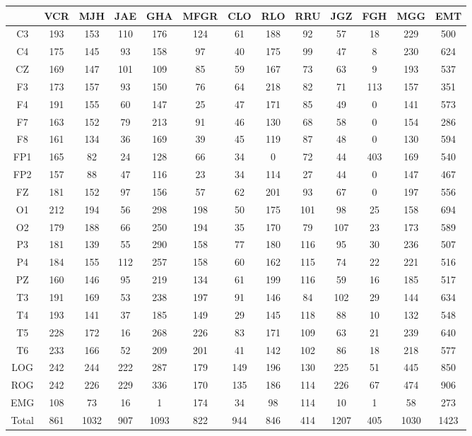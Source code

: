 \begin{SidewaysFigure}
\centering
\begin{tabular}{c|ccccc|cccc|ccc}
& VCR & MJH & JAE & GHA & MFGR
& CLO & RLO & RRU & JGZ
& FGH & MGG & EMT \\
\hline
C3&193&153&110&176&124&61&188&92&57&18&229&500 \\
C4&175&145&93&158&97&40&175&99&47&8&230&624 \\
CZ&169&147&101&109&85&59&167&73&63&9&193&537 \\
F3&173&157&93&150&76&64&218&82&71&113&157&351 \\
F4&191&155&60&147&25&47&171&85&49&0&141&573 \\
F7&163&152&79&213&91&46&130&68&58&0&154&286 \\
F8&161&134&36&169&39&45&119&87&48&0&130&594 \\
FP1&165&82&24&128&66&34&0&72&44&403&169&540 \\
FP2&157&88&47&116&23&34&114&27&44&0&147&467 \\
FZ&181&152&97&156&57&62&201&93&67&0&197&556 \\
O1&212&194&56&298&198&50&175&101&98&25&158&694 \\
O2&179&188&66&250&194&35&170&79&107&23&173&589 \\
P3&181&139&55&290&158&77&180&116&95&30&236&507 \\
P4&184&155&112&257&158&60&162&115&74&22&221&516 \\
PZ&160&146&95&219&134&61&199&116&59&16&185&517 \\
T3&191&169&53&238&197&91&146&84&102&29&144&634 \\
T4&193&141&37&185&149&29&145&118&88&10&132&548 \\
T5&228&172&16&268&226&83&171&109&63&21&239&640 \\
T6&233&166&52&209&201&41&142&102&86&18&218&577 \\
LOG&242&244&222&287&179&149&196&130&225&51&445&850 \\
ROG&242&226&229&336&170&135&186&114&226&67&474&906 \\
EMG&108&73&16&1&174&34&98&114&10&1&58&273 \\
\hline
Total&861&1032&907&1093&822&944&846&414&1207&405&1030&1423
\end{tabular}
\caption{Total de \'epocas PE registradas
(todas las fases) para cada
canal. 
}
\label{total_gpos_total}
\end{SidewaysFigure}






